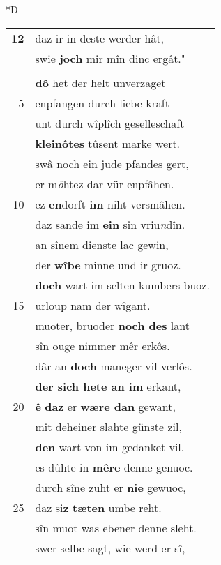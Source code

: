 \documentclass[8pt,a4paper,notitlepage]{article}
\begin{document}
\begin{table}[ht]
\begin{minipage}[t]{0.5\linewidth}
\small
\begin{center}*D
\end{center}
\begin{tabular}{rl}
\textbf{12} & daz ir in deste werder hât,\\ 
 & swie \textbf{joch} mir mîn dinc ergât."\\ 
 & \textit{\begin{large}A\end{large}}ls uns diu âventiure saget,\\ 
 & \textbf{dô} het der helt unverzaget\\ 
5 & enpfangen durch liebe kraft\\ 
 & unt durch wîplîch geselleschaft\\ 
 & \textbf{kleinôtes} tûsent marke wert.\\ 
 & swâ noch ein jude pfandes gert,\\ 
 & er m\textit{ö}htez dar vür enpfâhen.\\ 
10 & ez \textbf{en}dorft \textbf{im} niht versmâhen.\\ 
 & daz sande im \textbf{ein} sîn vriu\textit{n}dîn.\\ 
 & an sînem dienste lac gewin,\\ 
 & der \textbf{wîbe} minne und ir gruoz.\\ 
 & \textbf{doch} wart im selten kumbers buoz.\\ 
15 & urloup nam der wîgant.\\ 
 & muoter, bruoder \textbf{noch des} lant\\ 
 & sîn ouge nimmer mêr erkôs.\\ 
 & dâr an \textbf{doch} maneger vil verlôs.\\ 
 & \textbf{der sich hete an im} erkant,\\ 
20 & \textbf{ê} \textbf{daz} er \textbf{wære dan} gewant,\\ 
 & mit deheiner slahte günste zil,\\ 
 & \textbf{den} wart von im gedanket vil.\\ 
 & es dûhte in \textbf{mêre} denne genuoc.\\ 
 & durch sîne zuht er \textbf{nie} gewuoc,\\ 
25 & daz si\textbf{z} \textbf{tæten} umbe reht.\\ 
 & sîn muot was ebener denne sleht.\\ 
 & swer selbe sagt, wie werd er sî,\\ 

\end{tabular}
\end{minipage}
\end{table}
\end{document}
